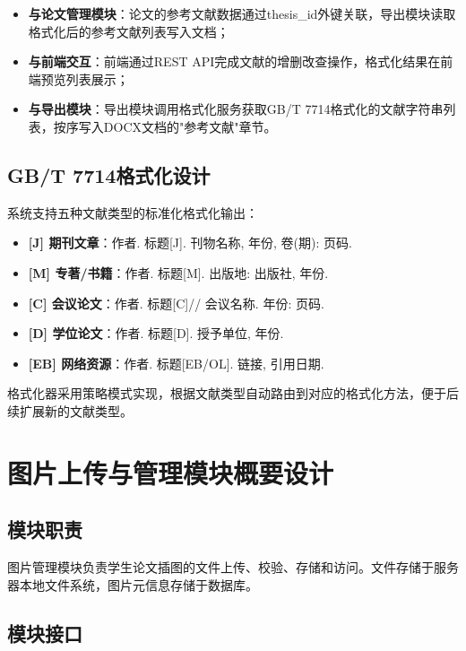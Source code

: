 \begin{itemize}
    \item \textbf{与论文管理模块}：论文的参考文献数据通过thesis\_id外键关联，导出模块读取格式化后的参考文献列表写入文档；
    \item \textbf{与前端交互}：前端通过REST API完成文献的增删改查操作，格式化结果在前端预览列表展示；
    \item \textbf{与导出模块}：导出模块调用格式化服务获取GB/T 7714格式化的文献字符串列表，按序写入DOCX文档的"参考文献"章节。
\end{itemize}

\subsection{GB/T 7714格式化设计}

系统支持五种文献类型的标准化格式化输出：

\begin{itemize}
    \item \textbf{[J] 期刊文章}：作者. 标题[J]. 刊物名称, 年份, 卷(期): 页码.
    \item \textbf{[M] 专著/书籍}：作者. 标题[M]. 出版地: 出版社, 年份.
    \item \textbf{[C] 会议论文}：作者. 标题[C]// 会议名称. 年份: 页码.
    \item \textbf{[D] 学位论文}：作者. 标题[D]. 授予单位, 年份.
    \item \textbf{[EB] 网络资源}：作者. 标题[EB/OL]. 链接, 引用日期.
\end{itemize}

格式化器采用策略模式实现，根据文献类型自动路由到对应的格式化方法，便于后续扩展新的文献类型。

\section{图片上传与管理模块概要设计}

\subsection{模块职责}

图片管理模块负责学生论文插图的文件上传、校验、存储和访问。文件存储于服务器本地文件系统，图片元信息存储于数据库。

\subsection{模块接口}

